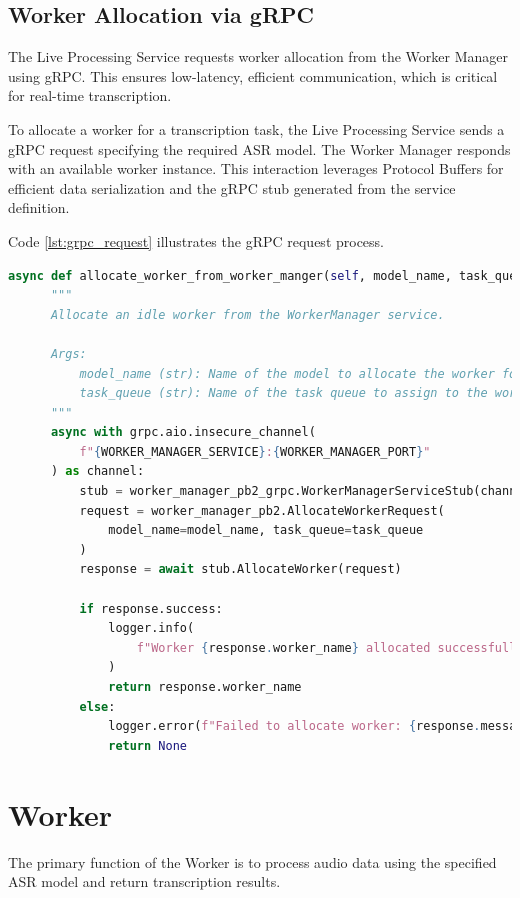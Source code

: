 \subsection{Worker Allocation via gRPC}
The Live Processing Service requests worker allocation from the Worker Manager using gRPC. This ensures low-latency, efficient communication, which is critical for real-time transcription.

To allocate a worker for a transcription task, the Live Processing Service sends a gRPC request specifying the required ASR model. The Worker Manager responds with an available worker instance. This interaction leverages Protocol Buffers for efficient data serialization and the gRPC stub generated from the service definition.

Code \ref{lst:grpc_request} illustrates the gRPC request process.

\begin{lstlisting}[language=python, caption={gRPC Request for Worker Allocation}, label={lst:grpc_request}]
async def allocate_worker_from_worker_manger(self, model_name, task_queue):
      """
      Allocate an idle worker from the WorkerManager service.

      Args:
          model_name (str): Name of the model to allocate the worker for.
          task_queue (str): Name of the task queue to assign to the worker.
      """
      async with grpc.aio.insecure_channel(
          f"{WORKER_MANAGER_SERVICE}:{WORKER_MANAGER_PORT}"
      ) as channel:
          stub = worker_manager_pb2_grpc.WorkerManagerServiceStub(channel)
          request = worker_manager_pb2.AllocateWorkerRequest(
              model_name=model_name, task_queue=task_queue
          )
          response = await stub.AllocateWorker(request)

          if response.success:
              logger.info(
                  f"Worker {response.worker_name} allocated successfully: {response.message}"
              )
              return response.worker_name
          else:
              logger.error(f"Failed to allocate worker: {response.message}")
              return None
\end{lstlisting}


\section{Worker}
The primary function of the Worker is to process audio data using the specified ASR model and return transcription results.  

